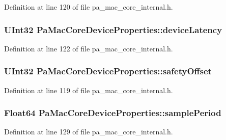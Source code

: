 Definition at line 120 of file pa\+\_\+mac\+\_\+core\+\_\+internal.\+h.

\subsubsection[{\texorpdfstring{device\+Latency}{deviceLatency}}]{\setlength{\rightskip}{0pt plus 5cm}U\+Int32 Pa\+Mac\+Core\+Device\+Properties\+::device\+Latency}\hypertarget{struct_pa_mac_core_device_properties_aaa0297847bc0987b066f0ece4ef0c532}{}\label{struct_pa_mac_core_device_properties_aaa0297847bc0987b066f0ece4ef0c532}


Definition at line 122 of file pa\+\_\+mac\+\_\+core\+\_\+internal.\+h.

\subsubsection[{\texorpdfstring{safety\+Offset}{safetyOffset}}]{\setlength{\rightskip}{0pt plus 5cm}U\+Int32 Pa\+Mac\+Core\+Device\+Properties\+::safety\+Offset}\hypertarget{struct_pa_mac_core_device_properties_ab303037c6a88e4b54f706f2d5d0be00c}{}\label{struct_pa_mac_core_device_properties_ab303037c6a88e4b54f706f2d5d0be00c}


Definition at line 119 of file pa\+\_\+mac\+\_\+core\+\_\+internal.\+h.

\subsubsection[{\texorpdfstring{sample\+Period}{samplePeriod}}]{\setlength{\rightskip}{0pt plus 5cm}Float64 Pa\+Mac\+Core\+Device\+Properties\+::sample\+Period}\hypertarget{struct_pa_mac_core_device_properties_a4124e492be364add3280ef5574a26fde}{}\label{struct_pa_mac_core_device_properties_a4124e492be364add3280ef5574a26fde}


Definition at line 129 of file pa\+\_\+mac\+\_\+core\+\_\+internal.\+h.

